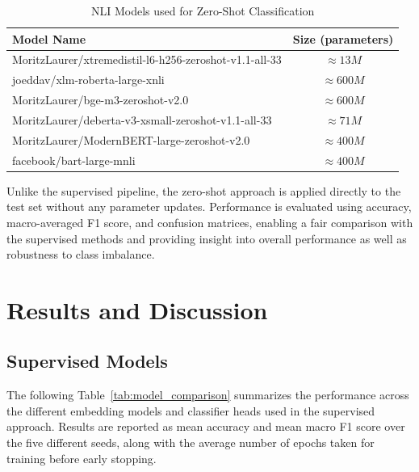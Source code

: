 \documentclass[runningheads]{llncs}
\begin{document}
\begin{table}[H]
\centering
\caption{NLI Models used for Zero-Shot Classification}
\label{tab:nli_models}
\begin{tabular}{lc}
\hline
\textbf{Model Name} & \textbf{Size (parameters)} \\
\hline
MoritzLaurer/xtremedistil-l6-h256-zeroshot-v1.1-all-33 & $\approx 13{M}$ \\
joeddav/xlm-roberta-large-xnli & $\approx 600{M}$ \\
MoritzLaurer/bge-m3-zeroshot-v2.0 & $\approx 600{M}$ \\
MoritzLaurer/deberta-v3-xsmall-zeroshot-v1.1-all-33 & $\approx 71{M}$ \\
MoritzLaurer/ModernBERT-large-zeroshot-v2.0 & $\approx 400{M}$ \\
facebook/bart-large-mnli & $\approx 400{M}$ \\
\hline
\end{tabular}
\end{table}
\noindent
Unlike the supervised pipeline, the zero-shot approach is applied directly to the test set without any parameter updates. Performance is evaluated using accuracy, macro-averaged F1 score, and confusion matrices, enabling a fair comparison with the supervised methods and providing insight into overall performance as well as robustness to class imbalance.

\section{Results and Discussion}

\subsection{Supervised Models}
The following Table~\ref{tab:model_comparison} summarizes the performance across the different embedding models and classifier heads used in the supervised approach. Results are reported as mean accuracy and mean macro F1 score over the five different seeds, along with the average number of epochs taken for training before early stopping.
\end{document}
